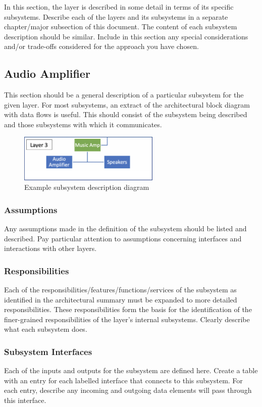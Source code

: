In this section, the layer is described in some detail in terms of its specific subsystems. Describe each of the layers and its subsystems in a separate chapter/major subsection of this document. The content of each subsystem description should be similar. Include in this section any special considerations and/or trade-offs considered for the approach you have chosen.

\subsection{Audio Amplifier}
This section should be a general description of a particular subsystem for the given layer. For most subsystems, an extract of the architectural block diagram with data flows is useful. This should consist of the subsystem being described and those subsystems with which it communicates.

\begin{figure}[h!]
	\centering
 	\includegraphics[width=0.60\textwidth]{images/subsystem3}
 \caption{Example subsystem description diagram}
\end{figure}

\subsubsection{Assumptions}
Any assumptions made in the definition of the subsystem should be listed and described. Pay particular attention to assumptions concerning interfaces and interactions with other layers.

\subsubsection{Responsibilities}
Each of the responsibilities/features/functions/services of the subsystem as identified in the architectural summary must be expanded to more detailed responsibilities. These responsibilities form the basis for the identification of the finer-grained responsibilities of the layer's internal subsystems. Clearly describe what each subsystem does.

\subsubsection{Subsystem Interfaces}
Each of the inputs and outputs for the subsystem are defined here. Create a table with an entry for each labelled interface that connects to this subsystem. For each entry, describe any incoming and outgoing data elements will pass through this interface.

